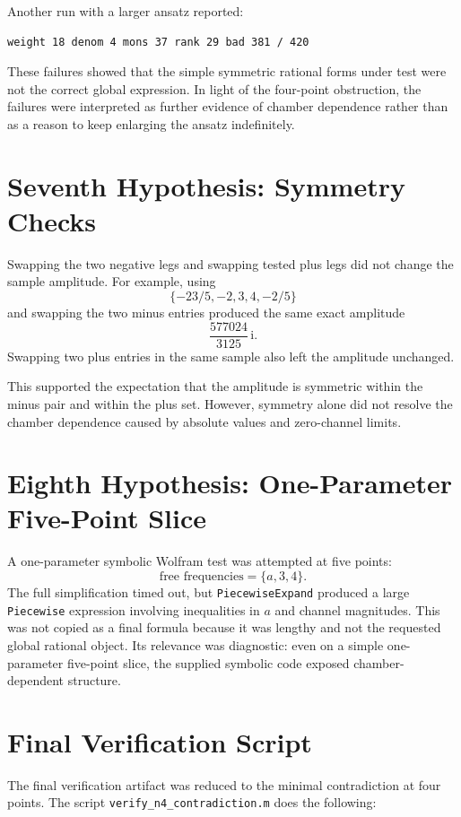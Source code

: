 \documentclass[11pt]{article}
\newcommand{\code}[1]{\texttt{#1}}
\newcommand{\ii}{\mathrm{i}}
\begin{document}
Another run with a larger ansatz reported:

\begin{Verbatim}[fontsize=\small]
weight 18 denom 4 mons 37 rank 29 bad 381 / 420
\end{Verbatim}

These failures showed that the simple symmetric rational forms under test were
not the correct global expression.  In light of the four-point obstruction,
the failures were interpreted as further evidence of chamber dependence rather
than as a reason to keep enlarging the ansatz indefinitely.

\section{Seventh Hypothesis: Symmetry Checks}

Swapping the two negative legs and swapping tested plus legs did not change the
sample amplitude.  For example, using
\[
  \{-23/5,-2,3,4,-2/5\}
\]
and swapping the two minus entries produced the same exact amplitude
\[
  \frac{577024}{3125}\,\ii.
\]
Swapping two plus entries in the same sample also left the amplitude unchanged.

This supported the expectation that the amplitude is symmetric within the
minus pair and within the plus set.  However, symmetry alone did not resolve
the chamber dependence caused by absolute values and zero-channel limits.

\section{Eighth Hypothesis: One-Parameter Five-Point Slice}

A one-parameter symbolic Wolfram test was attempted at five points:
\[
  \text{free frequencies}=\{a,3,4\}.
\]
The full simplification timed out, but \code{PiecewiseExpand} produced a large
\code{Piecewise} expression involving inequalities in \(a\) and channel
magnitudes.  This was not copied as a final formula because it was lengthy and
not the requested global rational object.  Its relevance was diagnostic: even
on a simple one-parameter five-point slice, the supplied symbolic code exposed
chamber-dependent structure.

\section{Final Verification Script}

The final verification artifact was reduced to the minimal contradiction at
four points.  The script \code{verify\_n4\_contradiction.m} does the following:
\end{document}
